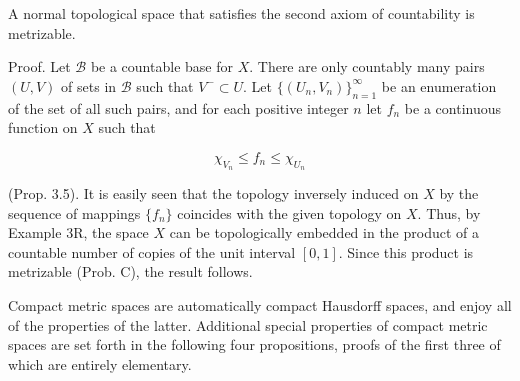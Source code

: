 A normal topological space that satisfies the second axiom of countability is metrizable.

Proof. Let $\mathcal{B}$ be a countable base for $X$. There are only countably many pairs $(U, V)$ of sets in $\mathcal{B}$ such that $V^- \subset U$. Let $\{(U_n, V_n)\}_{n=1}^{\infty}$ be an enumeration of the set of all such pairs, and for each positive integer $n$ let $f_n$ be a continuous function on $X$ such that

$$\chi_{V_n} \leq f_n \leq \chi_{U_n}$$

(Prop. 3.5). It is easily seen that the topology inversely induced on $X$ by the sequence of mappings $\{f_n\}$ coincides with the given topology on $X$. Thus, by Example 3R, the space $X$ can be topologically embedded in the product of a countable number of copies of the unit interval $[0, 1]$. Since this product is metrizable (Prob. C), the result follows.

Compact metric spaces are automatically compact Hausdorff spaces, and enjoy all of the properties of the latter. Additional special properties of compact metric spaces are set forth in the following four propositions, proofs of the first three of which are entirely elementary.
